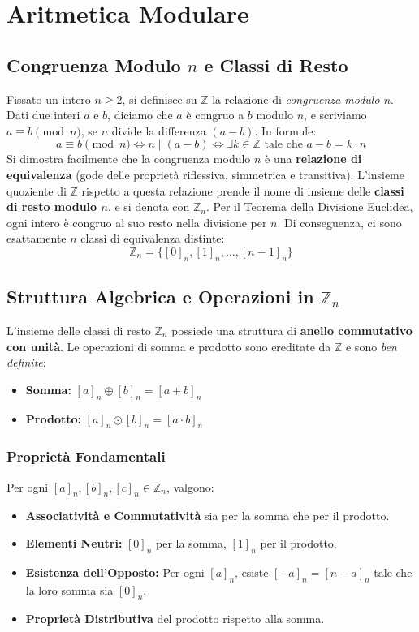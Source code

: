 \documentclass[12pt, a4paper]{article}
\begin{document}
\section{Aritmetica Modulare}

\subsection{Congruenza Modulo $n$ e Classi di Resto}
Fissato un intero $n \ge 2$, si definisce su $\mathbb{Z}$ la relazione di \emph{congruenza modulo $n$}. Dati due interi $a$ e $b$, diciamo che $a$ è congruo a $b$ modulo $n$, e scriviamo $a \equiv b \pmod n$, se $n$ divide la differenza $(a - b)$. In formule:
\[ a \equiv b \pmod n \iff n \mid (a - b) \iff \exists k \in \mathbb{Z} \text{ tale che } a - b = k \cdot n \]
Si dimostra facilmente che la congruenza modulo $n$ è una \textbf{relazione di equivalenza} (gode delle proprietà riflessiva, simmetrica e transitiva).
L'insieme quoziente di $\mathbb{Z}$ rispetto a questa relazione prende il nome di insieme delle \textbf{classi di resto modulo $n$}, e si denota con $\mathbb{Z}_n$.
Per il Teorema della Divisione Euclidea, ogni intero è congruo al suo resto nella divisione per $n$. Di conseguenza, ci sono esattamente $n$ classi di equivalenza distinte:
\[ \mathbb{Z}_n = \{[0]_n, [1]_n, \ldots, [n-1]_n\} \]

\subsection{Struttura Algebrica e Operazioni in $\mathbb{Z}_n$}
L'insieme delle classi di resto $\mathbb{Z}_n$ possiede una struttura di \textbf{anello commutativo con unità}. Le operazioni di somma e prodotto sono ereditate da $\mathbb{Z}$ e sono \textit{ben definite}:
\begin{itemize}
    \item \textbf{Somma:} $[a]_n \oplus [b]_n = [a + b]_n$
    \item \textbf{Prodotto:} $[a]_n \odot [b]_n = [a \cdot b]_n$
\end{itemize}

\subsubsection*{Proprietà Fondamentali}
Per ogni $[a]_n, [b]_n, [c]_n \in \mathbb{Z}_n$, valgono:
\begin{itemize}
    \item \textbf{Associatività e Commutatività} sia per la somma che per il prodotto.
    \item \textbf{Elementi Neutri:} $[0]_n$ per la somma, $[1]_n$ per il prodotto.
    \item \textbf{Esistenza dell'Opposto:} Per ogni $[a]_n$, esiste $[-a]_n = [n-a]_n$ tale che la loro somma sia $[0]_n$.
    \item \textbf{Proprietà Distributiva} del prodotto rispetto alla somma.
\end{itemize}
\end{document}
